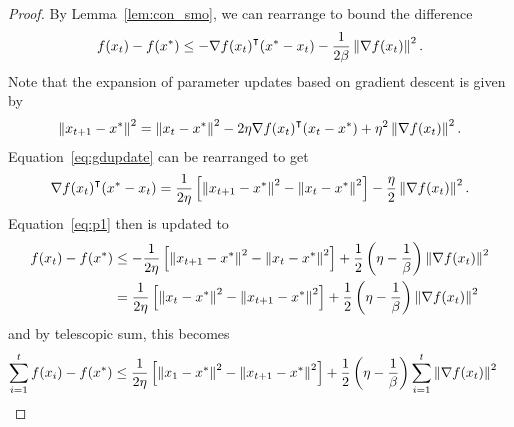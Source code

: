 \begin{proof}
    By Lemma~\ref{lem:con_smo}, we can rearrange to bound the difference 
    \begin{equation}
        \label{eq:p1}
        f(x_t) - f(x^*) \leq -\nabla {f(x_t)}^\intercal (x^* - x_t) - \frac{1}{2\beta}
        \left\| \nabla f(x_t) \right\|^2.
    \end{equation}
    Note that the expansion of parameter updates based on gradient descent is
    given by
    \begin{equation}
        \label{eq:gdupdate}
        \begin{aligned}
            \left\| x_{t + 1} - x^* \right\|^2 &= \left\| x_t - x^* \right\|^2 - 2\eta {\nabla
            f(x_t)}^\intercal (x_t - x^*) + \eta^2 \left\| \nabla f(x_t) \right\|^2. \\
        \end{aligned}
    \end{equation}
    Equation~\ref{eq:gdupdate} can be rearranged to get
    \begin{equation}
        {\nabla f(x_t)}^\intercal (x^* - x_t) =
        \frac{1}{2\eta}\left[\left\| x_{t + 1} - x^* \right\|^2 - \left\| x_t - x^* \right\|^2 
        \right]  - \frac{\eta}{2} \left\| \nabla f(x_t) \right\|^2.
    \end{equation}
    Equation~\ref{eq:p1} then is updated to 
    \begin{equation}
        \begin{aligned}
            \label{eq:}
        f(x_t) - f(x^*) &\leq
        -\frac{1}{2\eta}\left[\left\| x_{t + 1} - x^* \right\|^2 - \left\| x_t - x^* \right\|^2 
        \right]  + \frac{1}{2} \left(\eta - \frac{1}{\beta}\right)\left\| \nabla f(x_t) \right\|^2
        \\ &=
        \frac{1}{2\eta}\left[\left\| x_{t} - x^* \right\|^2 - \left\| x_{t+1} - x^* \right\|^2 
        \right]  + \frac{1}{2} \left(\eta - \frac{1}{\beta}\right)\left\| \nabla f(x_t) \right\|^2
        \end{aligned}
    \end{equation}
    and by telescopic sum, this becomes
    \begin{equation}
        \label{eq:last}
        \begin{aligned}
            \sum_{i = 1}^t f(x_i) - f(x^*) &\leq
        \frac{1}{2\eta}\left[\left\| x_1 - x^* \right\|^2 - \left\| x_{t+1} - x^* \right\|^2 
            \right]  + \frac{1}{2} \left(\eta - \frac{1}{\beta}\right)\sum_{i = 1}^t \left\| \nabla f(x_t) \right\|^2
        \end{aligned}
    \end{equation}
\end{proof}

